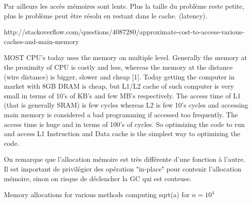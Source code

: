 Par ailleurs les accès mémoires sont lents. 
Plus la taille du problème reste petite, plus le problème peut être résolu en restant dans le cache. (latency).

http://stackoverflow.com/questions/4087280/approximate-cost-to-access-various-caches-and-main-memory

MOST CPU’s today uses the memory on multiple level.  Generally  the  memory  at  the  proximity  of  CPU  is costly and less, whereas the memory at the distance (wire distance)  is  bigger,  slower  and  cheap [1].  Today  getting  the  computer  in  market  with  8GB  DRAM  is  cheap,  but  L1/L2  cache  of  such  computer  is  very  small  in  terms  of 10’s  of  KB’s  and  few  MB’s  respectively.  The  access time  of  L1  (that  is  generally  SRAM) is  few  cycles whereas  L2  is  few  10’s  cycles  and  accessing  main memory  is  considered  a  bad  programming  if  accessed too  frequently.  The  access  time  is  huge  and  in  terms  of 100’s of cycles. So optimizing the code to run and access L1  Instruction  and  Data  cache  is  the  simplest  way  to optimizing the code.


On remarque que l'allocation mémoire est très différente d'une fonction à l'autre. Il est important de privilégier des opération "in-place" pour contenir l'allocation mémoire, sinon on risque de déclencher la GC qui est couteuse.

\begin{table}[h]
\centering
{}
\caption{Memory allocations for various methods computing sqrt(a) for $n = 10^4$}
\end{table}


